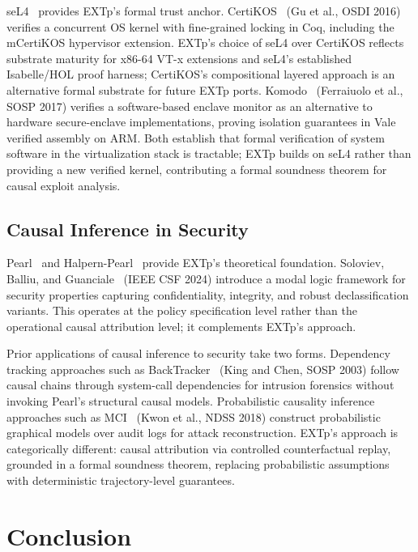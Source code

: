 \documentclass[conference]{IEEEtran}
\begin{document}
seL4~\cite{klein2009sel4,klein2014sel4} provides EXTp's formal trust
anchor. CertiKOS~\cite{gu2016certikos} (Gu et al., OSDI 2016)
verifies a concurrent OS kernel with fine-grained locking in Coq,
including the mCertiKOS hypervisor extension. EXTp's choice of seL4
over CertiKOS reflects substrate maturity for x86-64 VT-x extensions
and seL4's established Isabelle/HOL proof harness; CertiKOS's
compositional layered approach is an alternative formal substrate
for future EXTp ports. Komodo~\cite{ferraiuolo2017komodo}
(Ferraiuolo et al., SOSP 2017) verifies a software-based enclave
monitor as an alternative to hardware secure-enclave implementations,
proving isolation guarantees in Vale verified assembly on ARM. Both
establish that formal verification of system software in the
virtualization stack is tractable; EXTp builds on seL4 rather than
providing a new verified kernel, contributing a formal soundness
theorem for causal exploit analysis.

\subsection{Causal Inference in Security}

Pearl~\cite{pearl2009causality} and
Halpern-Pearl~\cite{halpern2005causes} provide EXTp's theoretical
foundation. Soloviev, Balliu, and
Guanciale~\cite{soloviev2024modal} (IEEE CSF 2024) introduce a
modal logic framework for security properties capturing
confidentiality, integrity, and robust declassification variants.
This operates at the policy specification level rather than the
operational causal attribution level; it complements EXTp's
approach.

Prior applications of causal inference to security take two forms.
Dependency tracking approaches such as
BackTracker~\cite{king2003backtracking} (King and Chen, SOSP 2003)
follow causal chains through system-call dependencies for intrusion
forensics without invoking Pearl's structural causal models.
Probabilistic causality inference approaches such as
MCI~\cite{kwon2018mci} (Kwon et al., NDSS 2018) construct
probabilistic graphical models over audit logs for attack
reconstruction. EXTp's approach is categorically different: causal
attribution via controlled counterfactual replay, grounded in a
formal soundness theorem, replacing probabilistic assumptions with
deterministic trajectory-level guarantees.

\section{Conclusion}\label{sec:conclusion}
\end{document}
